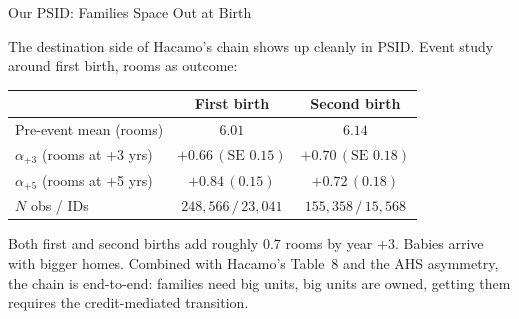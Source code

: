 \documentclass[11pt,aspectratio=169]{beamer}
\begin{document}
\begin{frame}{Our PSID: Families Space Out at Birth}
\small

The destination side of Hacamo's chain shows up cleanly in PSID. Event study around first birth, rooms as outcome:

\smallskip
\centering
\begin{tabular}{lcc}
\toprule
& \textbf{First birth} & \textbf{Second birth}\\
\midrule
Pre-event mean (rooms) & $6.01$ & $6.14$\\
$\alpha_{+3}$ (rooms at +3 yrs) & $\mathbf{+0.66}\,(\text{SE } 0.15)$ & $\mathbf{+0.70}\,(\text{SE } 0.18)$\\
$\alpha_{+5}$ (rooms at +5 yrs) & $+0.84\,(0.15)$ & $+0.72\,(0.18)$\\
$N$ obs / IDs & $248{,}566\,/\,23{,}041$ & $155{,}358\,/\,15{,}568$\\
\bottomrule
\end{tabular}

\smallskip\flushleft
Both first and second births add roughly $0.7$ rooms by year $+3$. Babies arrive with bigger homes. Combined with Hacamo's Table~8 and the AHS asymmetry, the chain is end-to-end: families need big units, big units are owned, getting them requires the credit-mediated transition.

\end{frame}
\end{document}
